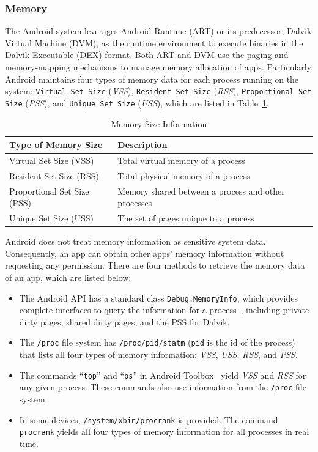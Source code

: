 \documentclass[letterpaper,12pt]{article}
\begin{document}
\subsubsection{Memory}
The Android system leverages Android Runtime (ART) or its predecessor, Dalvik Virtual Machine (DVM), as the runtime environment to execute binaries in the Dalvik Executable (DEX) format. Both ART and DVM use the paging and memory-mapping mechanisms \cite{androidmemoverview} to manage memory allocation of apps. Particularly, Android maintains four types of memory data for each process running on the system: \texttt{Virtual Set Size} (\emph{VSS}), \texttt{Resident Set Size} (\emph{RSS}), \texttt{Proportional Set Size} (\emph{PSS}), and \texttt{Unique Set Size} (\emph{USS}), which are listed in Table~\ref{tab:memory}.

\begin{table}[h]
\centering
    \caption{Memory Size Information}
\begin{tabular}{|l|p{4.5cm}|}
    \hline\hline 
    \textbf{Type of Memory Size} & \textbf{Description} \\ 
    \hline\hline 
    \small Virtual Set Size (VSS) & \small Total virtual memory of a process \\ 
    \hline 
    \small Resident Set Size (RSS) & \small Total physical memory of a process \\ 
    \hline 
    \small Proportional Set Size (PSS) & \small Memory shared between a process and other processes \\ 
    \hline 
    \small Unique Set Size (USS) & \small  The set of pages unique to a process\\ 
    \hline 

\end{tabular} 
        \label{tab:memory}
\end{table}

Android does not treat memory information as sensitive
system data. Consequently, an app can obtain other apps' memory
information without requesting any permission. There are four methods to retrieve
the memory data of an app, which are listed below:
%
\begin{itemize}
\item The Android API has a standard class \texttt{Debug.MemoryInfo},
  which provides complete interfaces to query the information for
  a process~\cite{apimem}, including private dirty pages, shared dirty
  pages, and the PSS for Dalvik.
\item The \texttt{/proc} file system has \texttt{/proc/pid/statm}
  (\texttt{pid} is the id of the process) that lists all four types of
  memory information: \emph{VSS}, \emph{USS}, \emph{RSS}, and \emph{PSS}.
\item The commands ``\texttt{top}'' and ``\texttt{ps}'' in Android
  Toolbox~\cite{toolbox} yield \emph{VSS} and \emph{RSS} for any given
  process. These commands also use information from the \texttt{/proc}
  file system.
\item In some devices, \texttt{/system/xbin/procrank} is provided.
  The command \texttt{procrank} yields all four types of memory
  information for all processes in real time.
\end{itemize}
\end{document}
